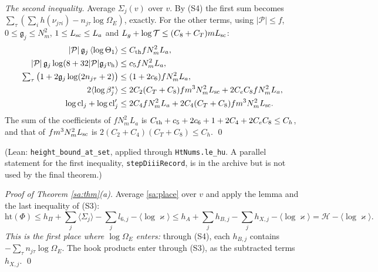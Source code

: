 \documentclass[11pt,letterpaper]{article}
\begin{document}
\emph{The second inequality.} Average $\Sigma_j(v)$ over $v$. By (S4) the first sum becomes
$\sum_\tau(\sum_ih(\nu_{j\tau i})-n_{j\tau}\log\Omega_E)$, exactly. For the other terms, using
$|\mathcal P|\le f$, $0\le\mathfrak g_j\le N_m^2$, $1\le L_{\rm sc}\le L_a$ and
$L_g+\log\mathcal T\le(C_8+C_T)mL_{\rm sc}$:
\begin{align}\label{D:272}
 |\mathcal P|\,\mathfrak g_j\,\langle\log\Theta_1\rangle&\le C_{\rm th}fN_m^2L_a,\\
 |\mathcal P|\,\mathfrak g_j\log(8+32|\mathcal P|\mathfrak g_jv_{\rm h})&\le c_5fN_m^2L_a,\\
 \textstyle\sum_\tau\big(1+2\mathfrak g_j\log(2n_{j\tau}+2)\big)&\le(1+2c_6)fN_m^2L_a,\\
 2\langle\log\beta^{*}_j\rangle&\le2C_2(C_T+C_8)fm^3N_m^2L_{\rm sc}+2C_eC_8fN_m^2L_a,\\
 \log\mathrm{cl}_j+\log\mathrm{cl}_j'&\le2C_4fN_m^2L_a+2C_4(C_T+C_8)fm^3N_m^2L_{\rm sc}.
\end{align}
The sum of the coefficients of $fN_m^2L_a$ is $C_{\rm th}+c_5+2c_6+1+2C_4+2C_eC_8\le C_h$, and that of
$fm^3N_m^2L_{\rm sc}$ is $2(C_2+C_4)(C_T+C_8)\le C_h$. \qed

\noindent(Lean: \texttt{height\_bound\_at\_set}, applied through \texttt{HtNums.le\_hu}. A parallel
statement for the first inequality, \texttt{stepDiiiRecord}, is in the archive but is not used by the
final theorem.)

\emph{Proof of Theorem \ref{sa:thm}(a).} Average \eqref{sa:place} over $v$ and apply the lemma and the
last inequality of (S3):
\begin{equation}\label{D:273}
 \mathrm{ht}(\Phi)\le h_\Pi+\sum_j\langle\Sigma_j\rangle-\sum_jl_{6,j}-\langle\log\varkappa\rangle
 \le h_A+\sum_jh_{B,j}-\sum_jh_{X,j}-\langle\log\varkappa\rangle=\mathcal H-\langle\log\varkappa\rangle .
\end{equation}
\emph{This is the first place where $\log\Omega_E$ enters:} through (S4), each $h_{B,j}$ contains
$-\sum_\tau n_{j\tau}\log\Omega_E$. The hook products enter through (S3), as the subtracted terms
$h_{X,j}$. \qed
\end{document}
